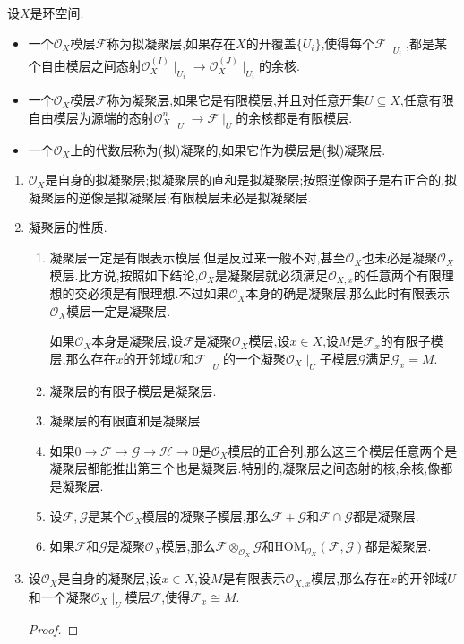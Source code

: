 设$X$是环空间.
\begin{itemize}
	\item 一个$\mathscr{O}_X$模层$\mathscr{F}$称为拟凝聚层,如果存在$X$的开覆盖$\{U_i\}$,使得每个$\mathscr{F}\mid_{U_i}$,都是某个自由模层之间态射$\mathscr{O}_X^{(I)}\mid_{U_i}\to\mathscr{O}_X^{(J)}\mid_{U_i}$的余核.
	\item 一个$\mathscr{O}_X$模层$\mathscr{F}$称为凝聚层,如果它是有限模层,并且对任意开集$U\subseteq X$,任意有限自由模层为源端的态射$\mathscr{O}_X^n\mid_U\to\mathscr{F}\mid_U$的余核都是有限模层.
	\item 一个$\mathscr{O}_X$上的代数层称为(拟)凝聚的,如果它作为模层是(拟)凝聚层.
\end{itemize}
\begin{enumerate}
	\item $\mathscr{O}_X$是自身的拟凝聚层;拟凝聚层的直和是拟凝聚层;按照逆像函子是右正合的,拟凝聚层的逆像是拟凝聚层;有限模层未必是拟凝聚层.
	\item 凝聚层的性质.
	\begin{enumerate}[(1)]
		\item 凝聚层一定是有限表示模层,但是反过来一般不对,甚至$\mathscr{O}_X$也未必是凝聚$\mathscr{O}_X$模层.比方说,按照如下结论,$\mathscr{O}_X$是凝聚层就必须满足$\mathscr{O}_{X,x}$的任意两个有限理想的交必须是有限理想.不过如果$\mathscr{O}_X$本身的确是凝聚层,那么此时有限表示$\mathscr{O}_X$模层一定是凝聚层.
		
		\qquad
		
		如果$\mathscr{O}_X$本身是凝聚层,设$\mathscr{F}$是凝聚$\mathscr{O}_X$模层,设$x\in X$,设$M$是$\mathscr{F}_x$的有限子模层,那么存在$x$的开邻域$U$和$\mathscr{F}\mid_U$的一个凝聚$\mathscr{O}_X\mid_U$子模层$\mathscr{G}$满足$\mathscr{G}_x=M$.
		\item 凝聚层的有限子模层是凝聚层.
		\item 凝聚层的有限直和是凝聚层.
		\item 如果$0\to\mathscr{F}\to\mathscr{G}\to\mathscr{H}\to0$是$\mathscr{O}_X$模层的正合列,那么这三个模层任意两个是凝聚层都能推出第三个也是凝聚层.特别的,凝聚层之间态射的核,余核,像都是凝聚层.
		\item 设$\mathscr{F},\mathscr{G}$是某个$\mathscr{O}_X$模层的凝聚子模层,那么$\mathscr{F}+\mathscr{G}$和$\mathscr{F}\cap\mathscr{G}$都是凝聚层.
		\item 如果$\mathscr{F}$和$\mathscr{G}$是凝聚$\mathscr{O}_X$模层,那么$\mathscr{F}\otimes_{\mathscr{O}_X}\mathscr{G}$和$\mathrm{HOM}_{\mathscr{O}_X}(\mathscr{F},\mathscr{G})$都是凝聚层.
	\end{enumerate}
	\item 设$\mathscr{O}_X$是自身的凝聚层,设$x\in X$,设$M$是有限表示$\mathscr{O}_{X,x}$模层,那么存在$x$的开邻域$U$和一个凝聚$\mathscr{O}_X\mid_U$模层$\mathscr{F}$,使得$\mathscr{F}_x\cong M$.
	\begin{proof}
		

\end{proof}
\end{enumerate}
